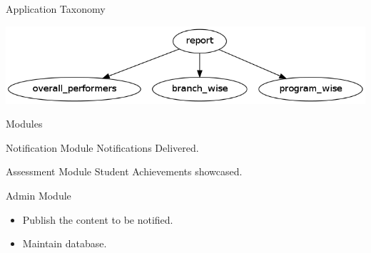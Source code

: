 \documentclass[14pt]{beamer}
\begin{document}
\begin{frame}{Application Taxonomy}
	\begin{center}
	\includegraphics[scale = 0.4]{report.png}
	\end{center}
\end{frame}

\begin{frame}{Modules}
	\begin{block}{Notification Module}
		Notifications Delivered.
	\end{block}
	\begin{block}{Assessment Module}
		Student Achievements showcased.
	\end{block}
	\begin{block}{Admin Module}
		\begin{itemize}
		\item Publish the content to be notified.
		\item Maintain database.
		\end{itemize}
	\end{block}
\end{frame}
\end{document}
